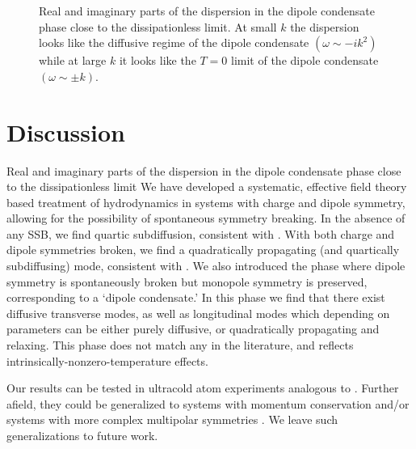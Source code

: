 \begin{figure}[th!]
    \centering
    \caption[Dispersion in the dipole condensate phase close to the dissipationless limit]{Real and imaginary parts of the dispersion in the dipole condensate phase close to the dissipationless limit. At small $k$ the dispersion looks like the diffusive regime of the dipole condensate $(\omega \sim -ik^2)$ while at large $k$ it looks like the $T=0$ limit of the dipole condensate $(\omega\sim\pm k)$.}
    \label{fig:NoDiss}
\end{figure}











\section{Discussion}
Real and imaginary parts of the dispersion in the dipole condensate phase close to the dissipationless limit
We have developed a systematic, effective field theory based treatment of hydrodynamics in systems with charge and dipole symmetry, allowing for the possibility of spontaneous symmetry breaking. In the absence of any SSB, we find quartic subdiffusion, consistent with \cite{Gromov2020Fracton}. With both charge and dipole symmetries broken, we find a quadratically propagating (and quartically subdiffusing) mode, consistent with \cite{Lake2022Dipolar}. We also introduced the phase where dipole symmetry is spontaneously broken but monopole symmetry is preserved, corresponding to a `dipole condensate.' In this phase we find that there exist diffusive transverse modes, as well as longitudinal modes which depending on parameters can be either purely diffusive, or quadratically propagating and relaxing. This phase does not match any in the literature, and reflects intrinsically-nonzero-temperature effects.

Our results can be tested in ultracold atom experiments analogous to \cite{GuardadoSanchez2020}. Further afield, they could be generalized to systems with momentum conservation and/or systems with more complex multipolar symmetries \cite{Bulmash2023Multipole}. We leave such generalizations to future work. 

